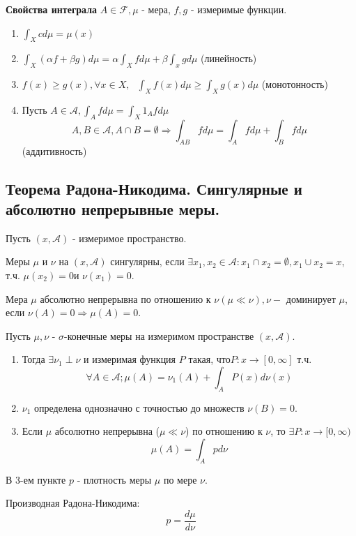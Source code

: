 \textbf{Свойства интеграла} $A \in \mathcal{F}, \mu$ - мера, $f, g$ - измеримые функции.
\begin{enumerate}
	\item $\int_X c d \mu = \mu (x)$
	\item $\int_X (\alpha f + \beta g) d \mu = \alpha \int_X f d \mu + \beta \int_x g d \mu$ (линейность)
	\item $f(x) \ge g(x), \forall x \in X, ~~~ \int_X f(x) d \mu \ge \int_X g(x) d \mu$ (монотонность)
	\item Пусть $A \in \mathcal{A}, \int_A f d \mu = \int_X 1_A f d \mu$
	\[ A, B \in \mathcal{A}, A \cap B = \emptyset \Rightarrow \int_{AB} f d \mu = \int_A f d \mu + \int_B f d \mu \]
	(аддитивность)
\end{enumerate}

\subsection{Теорема Радона-Никодима. Сингулярные и абсолютно непрерывные меры.}

Пусть $(x, \mathcal{A})$ - измеримое пространство.

\begin{definition}
	Меры $\mu$ и $\nu$ на $(x, \mathcal{A})$ сингулярны, если $\exists x_1, x_2 \in \mathcal{A}: x_1 \cap x_2 = \emptyset, x_1 \cup x_2 = x$, т.ч. $\mu (x_2) = 0$и $\nu (x_1) = 0$.
\end{definition}

\begin{definition}
	Мера $\mu$ абсолютно непрерывна по отношению к $\nu (\mu \ll \nu), \nu - \text{ доминирует } \mu$, если $\nu(A) = 0 \Rightarrow \mu(A) = 0$.
\end{definition}

\begin{theorem}
	Пусть $\mu, \nu$ - $\sigma$-конечные меры на измеримом пространстве $(x, \mathcal{A})$.
	\begin{enumerate}
		\item Тогда $\exists \nu_1 \perp \nu$ и измеримая функция $P$ такая, что$P: x \to [0, \infty]$ т.ч.
		\[  \forall A \in \mathcal{A}; \mu(A) = \nu_1 (A) + \int_A P (x) d \nu (x)  \]
		\item $\nu_1$ определена однозначно с точностью до множеств $\nu (B) = 0$.
		\item Если $\mu$ абсолютно непрерывна ($\mu \ll \nu$) по отношению к $\nu$, то $\exists P: x \to [0, \infty)$
		\[ \mu (A) = \int_A p d \nu \]
	\end{enumerate}
\end{theorem}
\begin{remark}
	В 3-ем пункте $p$ - плотность меры $\mu$ по мере $\nu$.
	
	Производная Радона-Никодима:
	\[ p = \frac{d \mu}{d \nu} \]
\end{remark}

